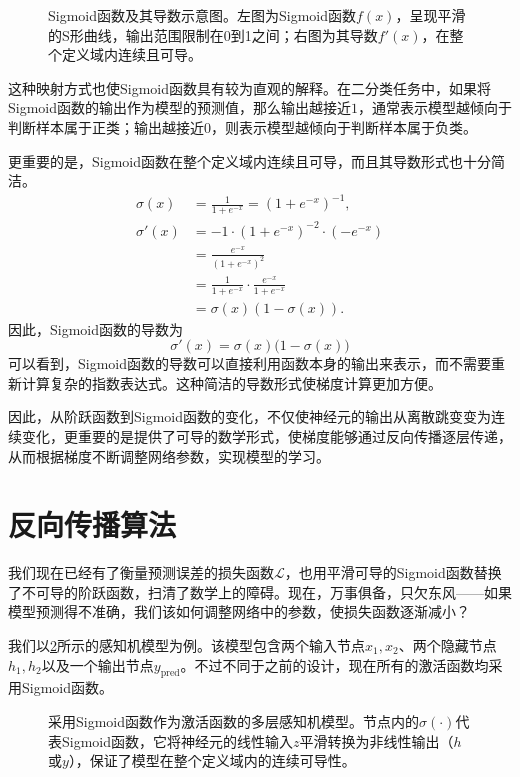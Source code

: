 \begin{figure}[H]
    \caption{Sigmoid函数及其导数示意图。左图为Sigmoid函数$f(x)$，呈现平滑的S形曲线，输出范围限制在0到1之间；右图为其导数$f'(x)$，在整个定义域内连续且可导。}
    \label{fig:sigmoid}
\end{figure}

这种映射方式也使Sigmoid函数具有较为直观的解释。在二分类任务中，如果将Sigmoid函数的输出作为模型的预测值，那么输出越接近$1$，通常表示模型越倾向于判断样本属于正类；输出越接近$0$，则表示模型越倾向于判断样本属于负类。

更重要的是，Sigmoid函数在整个定义域内连续且可导，而且其导数形式也十分简洁。
\begin{align*}
\sigma(x) &= \frac{1}{1+e^{-x}} = (1+e^{-x})^{-1}, \\
\sigma'(x) &= -1 \cdot (1+e^{-x})^{-2} \cdot (-e^{-x}) \\
&= \frac{e^{-x}}{(1+e^{-x})^2} \\
&= \frac{1}{1+e^{-x}} \cdot \frac{e^{-x}}{1+e^{-x}} \\
&= \sigma(x) \left(1-\sigma(x)\right).
\end{align*}
因此，Sigmoid函数的导数为
$$
\sigma'(x)=\sigma(x)\bigl(1-\sigma(x)\bigr)
$$
可以看到，Sigmoid函数的导数可以直接利用函数本身的输出来表示，而不需要重新计算复杂的指数表达式。这种简洁的导数形式使梯度计算更加方便。

因此，从阶跃函数到Sigmoid函数的变化，不仅使神经元的输出从离散跳变变为连续变化，更重要的是提供了可导的数学形式，使梯度能够通过反向传播逐层传递，从而根据梯度不断调整网络参数，实现模型的学习。

\section{反向传播算法}

我们现在已经有了衡量预测误差的损失函数$\mathcal{L}$，也用平滑可导的Sigmoid函数替换了不可导的阶跃函数，扫清了数学上的障碍。现在，万事俱备，只欠东风——如果模型预测得不准确，我们该如何调整网络中的参数，使损失函数逐渐减小？

我们以\cref{fig:mlp}所示的感知机模型为例。该模型包含两个输入节点$x_1,x_2$、两个隐藏节点$h_1,h_2$以及一个输出节点$y_{\text{pred}}$。不过不同于之前的设计，现在所有的激活函数均采用Sigmoid函数。
\begin{figure}[H]
    \caption{采用Sigmoid函数作为激活函数的多层感知机模型。节点内的$\sigma(\cdot)$代表Sigmoid函数，它将神经元的线性输入$z$平滑转换为非线性输出（$h$或$y$），保证了模型在整个定义域内的连续可导性。}
    \label{fig:mlp}
\end{figure}

